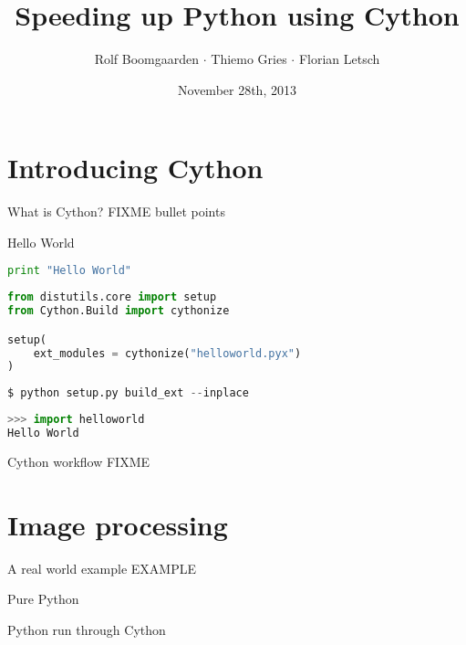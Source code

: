 \documentclass[dvipsnames]{beamer}
\title{Speeding up Python using Cython}
\author[Rolf $\cdot$ Thiemo $\cdot$ Flo]{Rolf Boomgaarden $\cdot$ Thiemo Gries $\cdot$ Florian Letsch}
\institute{Universität Hamburg}
\date{November 28th, 2013}
\begin{document}
\frame
{
\titlepage
}


\section{Introducing Cython}
\begin{frame}{What is Cython?}
FIXME bullet points
\end{frame}

\begin{frame}[fragile]{Hello World}
\begin{lstlisting}[language=Python]
print "Hello World"
\end{lstlisting}

\begin{lstlisting}[language=Python]
from distutils.core import setup
from Cython.Build import cythonize

setup(
    ext_modules = cythonize("helloworld.pyx")
)
\end{lstlisting}

\begin{lstlisting}[language=Python]
$ python setup.py build_ext --inplace
\end{lstlisting}

\begin{lstlisting}[language=Python]
>>> import helloworld
Hello World
\end{lstlisting}

\end{frame}

\begin{frame}{Cython workflow}
FIXME
\end{frame}


\section{Image processing}

\begin{frame}{A real world example}
EXAMPLE
\end{frame}

\begin{frame}{Pure Python}

\end{frame}

\begin{frame}{Python run through Cython}

\end{frame}
\end{document}
